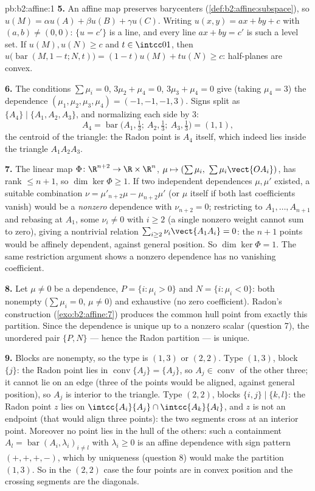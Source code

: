 \begin{solution}{pb:b2:affine:1}
\textbf{5.} An affine map preserves barycenters
(\cref{def:b2:affine:subspace}), so $u(M) = \alpha u(A) +
\beta u(B) + \gamma u(C)$. Writing $u(x, y) = ax + by + c$
with $(a, b) \neq (0,0)$: $\{u = c'\}$ is a line, and every
line $ax + by = c'$ is such a level set. If $u(M), u(N) \geq
c$ and $t \in \intcc01$, then $u\bigl(\operatorname{bar}(M,
1-t; N, t)\bigr) = (1-t)u(M) + tu(N) \geq c$: half-planes are
convex.

\textbf{6.} The conditions $\sum\mu_i = 0$, $3\mu_2 + \mu_4 =
0$, $3\mu_3 + \mu_4 = 0$ give (taking $\mu_4 = 3$) the
dependence $(\mu_1, \mu_2, \mu_3, \mu_4) = (-1, -1, -1, 3)$.
Signs split as $\{A_4\} \mid \{A_1, A_2, A_3\}$, and
normalizing each side by $3$:
\[
A_4 = \operatorname{bar}\bigl(A_1, \tfrac13;\ A_2, \tfrac13;\
A_3, \tfrac13\bigr) = (1,1),
\]
the centroid of the triangle: the Radon point is $A_4$
itself, which indeed lies inside the triangle $A_1A_2A_3$.

\textbf{7.} The linear map $\Phi \colon \R^{n+2} \to \R
\times \R^n$, $\mu \mapsto (\sum\mu_i,\
\sum\mu_i\vect{OA_i})$, has rank $\leq n + 1$, so $\dim\ker
\Phi \geq 1$. If two independent dependences $\mu, \mu'$
existed, a suitable combination $\nu = \mu'_{n+2}\mu -
\mu_{n+2}\mu'$ (or $\mu$ itself if both last coefficients
vanish) would be a \emph{nonzero} dependence with $\nu_{n+2}
= 0$; restricting to $A_1, \dots, A_{n+1}$ and rebasing at
$A_1$, some $\nu_i \neq 0$ with $i \geq 2$ (a single nonzero
weight cannot sum to zero), giving a nontrivial relation
$\sum_{i\geq2}\nu_i\vect{A_1A_i} = 0$: the $n+1$ points would
be affinely dependent, against general position. So $\dim\ker
\Phi = 1$. The same restriction argument shows a nonzero
dependence has no vanishing coefficient.

\textbf{8.} Let $\mu \neq 0$ be a dependence, $P = \{i :
\mu_i > 0\}$ and $N = \{i : \mu_i < 0\}$: both nonempty
($\sum\mu_i = 0$, $\mu \neq 0$) and exhaustive (no zero
coefficient). Radon's construction (\cref{exo:b2:affine:7})
produces the common hull point from exactly this partition.
Since the dependence is unique up to a nonzero scalar
(question 7), the unordered pair $\{P, N\}$ --- hence the
Radon partition --- is unique.

\textbf{9.} Blocks are nonempty, so the type is $(1,3)$ or
$(2,2)$. Type $(1,3)$, block $\{j\}$: the Radon point lies in
$\operatorname{conv}\{A_j\} = \{A_j\}$, so $A_j \in
\operatorname{conv}$ of the other three; it cannot lie on an
edge (three of the points would be aligned, against general
position), so $A_j$ is interior to the triangle. Type
$(2,2)$, blocks $\{i,j\} \mid \{k,l\}$: the Radon point $z$
lies on $\intcc{A_i}{A_j} \cap \intcc{A_k}{A_l}$, and $z$ is
not an endpoint (that would align three points): the two
segments cross at an interior point. Moreover no point lies
in the hull of the others: such a containment $A_l =
\operatorname{bar}(A_i, \lambda_i)_{i \neq l}$ with
$\lambda_i \geq 0$ is an affine dependence with sign pattern
$(+,+,+,-)$, which by uniqueness (question 8) would make the
partition $(1,3)$. So in the $(2,2)$ case the four points are
in convex position and the crossing segments are the
diagonals.


\end{solution}
